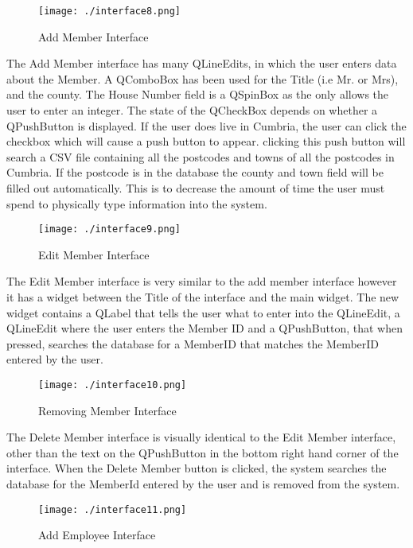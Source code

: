 \begin{figure}[H]
    \texttt{[image: ./interface8.png]}
    \caption{Add Member Interface} \label{fig:add-member-instance}
\end{figure}

The Add Member interface has many QLineEdits, in which the user enters data about the Member. A QComboBox has been used for the Title (i.e Mr. or Mrs), and the county. The House Number field is a QSpinBox as the only allows the user to enter an integer. The state of the QCheckBox depends on whether a QPushButton is displayed. If the user does live in Cumbria, the user can click the checkbox which will cause a push button to appear. clicking this push button will search a CSV file containing all the postcodes and towns of all the postcodes in Cumbria. If the postcode is in the database the county and town field will be filled out automatically. This is to decrease the amount of time the user must spend to physically type information into the system.


\begin{figure}[H]
    \texttt{[image: ./interface9.png]}
    \caption{Edit Member Interface} \label{fig:edit-member-instance}
\end{figure}

The Edit Member interface is very similar to the add member interface however it has a widget between the Title of the interface and the main widget. The new widget contains a QLabel that tells the user what to enter into the QLineEdit, a QLineEdit where the user enters the Member ID and a QPushButton, that when pressed, searches the database for a MemberID that matches the MemberID entered by the user. 

\begin{figure}[H]
    \texttt{[image: ./interface10.png]}
    \caption{Removing Member Interface} \label{fig:removing-member-interface}
\end{figure}

The Delete Member interface is visually identical to the Edit Member interface, other than the text on the QPushButton in the bottom right hand corner of the interface. When the Delete Member button is clicked, the system searches the database for the MemberId entered by the user and is removed from the system.

\begin{figure}[H]
    \texttt{[image: ./interface11.png]}
    \caption{Add Employee Interface} \label{fig:adding-employee-interface}
\end{figure}



